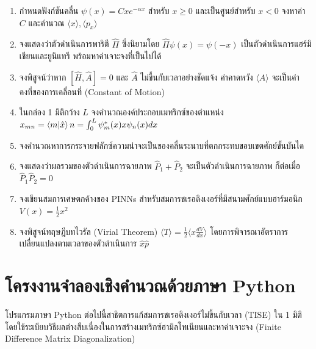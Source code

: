 \begin{enumerate}
    \item กำหนดฟังก์ชันคลื่น $\psi(x) = C x e^{-\alpha x}$ สำหรับ $x \ge 0$ และเป็นศูนย์สำหรับ $x < 0$ จงหาค่า $C$ และคำนวณ $\langle x \rangle, \langle p_x \rangle$
    \item จงแสดงว่าตัวดำเนินการพาริตี $\hat{\Pi}$ ซึ่งนิยามโดย $\hat{\Pi}\psi(x) = \psi(-x)$ เป็นตัวดำเนินการแฮร์มิเชียนและยูนิแทรี พร้อมหาค่าเจาะจงที่เป็นไปได้
    \item จงพิสูจน์ว่าหาก $[\hat{H}, \hat{A}] = 0$ และ $\hat{A}$ ไม่ขึ้นกับเวลาอย่างชัดแจ้ง ค่าคาดหวัง $\langle A \rangle$ จะเป็นค่าคงที่ของการเคลื่อนที่ (Constant of Motion)
    \item ในกล่อง 1 มิติกว้าง $L$ จงคำนวณองค์ประกอบเมทริกซ์ของตำแหน่ง $x_{mn} = \braket{m}{\hat{x}}{n} = \int_0^L \psi_m^*(x) x \psi_n(x) dx$
    \item จงคำนวณหาการกระจายฟลักซ์ความน่าจะเป็นของคลื่นระนาบที่ตกกระทบขอบเขตศักย์ขั้นบันได
    \item จงแสดงว่าผลรวมของตัวดำเนินการฉายภาพ $\hat{P}_1 + \hat{P}_2$ จะเป็นตัวดำเนินการฉายภาพ ก็ต่อเมื่อ $\hat{P}_1 \hat{P}_2 = 0$
    \item จงเขียนสมการเศษตกค้างของ PINNs สำหรับสมการชเรอดิงเงอร์ที่มีสนามศักย์แบบฮาร์มอนิก $V(x) = \frac{1}{2}x^2$
    \item จงพิสูจน์ทฤษฎีบทไวรัล (Virial Theorem) $\langle T \rangle = \frac{1}{2}\langle x \frac{dV}{dx} \rangle$ โดยการพิจารณาอัตราการเปลี่ยนแปลงตามเวลาของตัวดำเนินการ $\hat{x}\hat{p}$
\end{enumerate}

\section{โครงงานจำลองเชิงคำนวณด้วยภาษา Python}

โปรแกรมภาษา Python ต่อไปนี้สาธิตการแก้สมการชเรอดิงเงอร์ไม่ขึ้นกับเวลา (TISE) ใน 1 มิติ โดยใช้ระเบียบวิธีผลต่างสืบเนื่องในการสร้างเมทริกซ์ฮามิลโทเนียนและหาค่าเจาะจง (Finite Difference Matrix Diagonalization)

